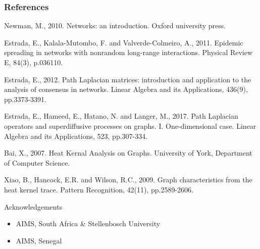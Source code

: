 \documentclass{beamer}
\begin{document}
\begin{frame}[allowframebreaks]
	\frametitle<presentation>{References}  
	\begin{thebibliography}{99} 
		
		 Newman, M., 2010. Networks: an introduction. Oxford university press.
		
		 Estrada, E., Kalala-Mutombo, F. and Valverde-Colmeiro, A., 2011. Epidemic spreading in networks with nonrandom long-range interactions. Physical Review E, 84(3), p.036110.
		
		 Estrada, E., 2012. Path Laplacian matrices: introduction and application to the analysis of consensus in networks. Linear Algebra and its Applications, 436(9), pp.3373-3391.
		
		 Estrada, E., Hameed, E., Hatano, N. and Langer, M., 2017. Path Laplacian operators and superdiffusive processes on graphs. I. One-dimensional case. Linear Algebra and its Applications, 523, pp.307-334.
		
		Bai, X., 2007. Heat Kernal Analysis on Graphs. University of York, Department of Computer Science.
		
		 Xiao, B., Hancock, E.R. and Wilson, R.C., 2009. Graph characteristics from the heat kernel trace. Pattern Recognition, 42(11), pp.2589-2606.
		
%		
		
	\end{thebibliography}
	
\end{frame}

\begin{frame}{Acknowledgements}
	\begin{itemize}
		\item AIMS, South Africa \& Stellenbosch University
		\item AIMS, Senegal
	\end{itemize}
	
\end{frame}

\end{document}
